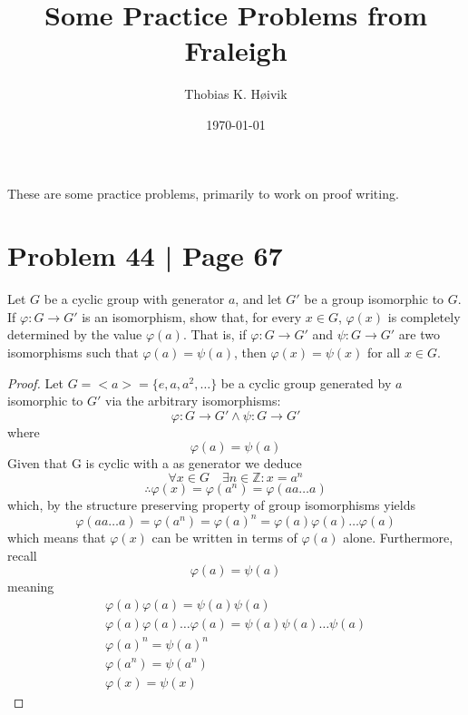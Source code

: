 \documentclass[12pt]{article}
\title{Some Practice Problems from Fraleigh}
\author{Thobias K. Høivik}
\date{\today}
\begin{document}
\maketitle
\noindent
These are some practice problems, primarily to work on proof writing.

\section*{Problem 44 | Page 67}
Let \( G \) be a cyclic group with generator \( a \), and let \( G' \)
be a group isomorphic to \( G \). If \( \varphi : G \to G' \) is an isomorphism, 
show that, for every \( x \in G \), \( \varphi(x) \) is completely 
determined by the value \( \varphi(a) \). 
That is, if \( \varphi : G \to G' \) and \( \psi : G \to G' \) 
are two isomorphisms such that \( \varphi(a) = \psi(a) \), 
then \( \varphi(x) = \psi(x) \) for all \( x \in G \).

\begin{proof}
    Let \(G = <a> = \{e, a, a^2, \dots\}\) 
    be a cyclic group generated by \(a\) isomorphic to \(G'\) 
    via the arbitrary isomorphisms: 
    \[ 
        \varphi: G \to G' \land \psi: G \to G'
    \]
    where  
    \[
        \varphi(a) = \psi(a)
    \]
    Given that G is cyclic with a as generator we deduce
    \[
        \forall x \in G \quad \exists n \in \mathbb Z : x = a^n 
    \] 
    \[ 
        \therefore \varphi(x) = \varphi(a^n) = \varphi(aa\dots a) 
    \]
    which, by the structure preserving property of group isomorphisms yields 
    \[ 
        \varphi(aa\dots a) = \varphi(a^n) = \varphi(a)^n 
        = \varphi(a) \varphi(a) \dots \varphi(a)
    \]
    which means that \(\varphi(x)\) can be written in terms of \(\varphi(a)\) alone. 
    Furthermore, recall
    \[ 
        \varphi(a) = \psi(a)
    \]
    meaning 
    \begin{gather*}
        \varphi(a)\varphi(a) = \psi(a)\psi(a) \\ 
        \varphi(a)\varphi(a)\dots\varphi(a) = \psi(a)\psi(a)\dots\psi(a) \\
        \varphi(a)^n = \psi(a)^n\\
        \varphi(a^n) = \psi(a^n) \\ 
        \varphi(x) = \psi(x)
    \end{gather*}

    
\end{proof}
\end{document}

